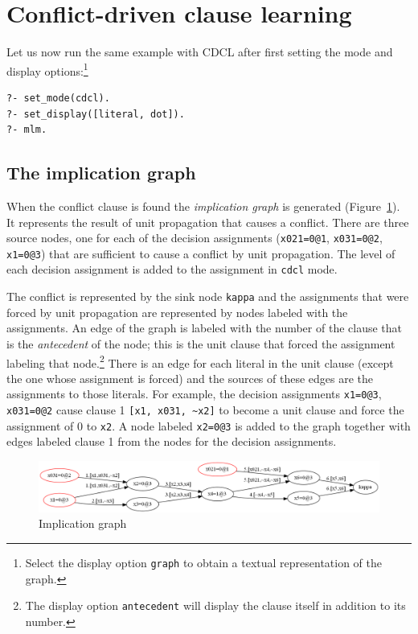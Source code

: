 \documentclass[11pt]{report}
\newcommand*{\p}[1]{\textup{\texttt{#1}}}
\begin{document}
\section{Conflict-driven clause learning}

Let us now run the same example with CDCL after first setting the mode
and display options:\footnote{Select the display option \p{graph} to
obtain a textual representation of the graph.}

\begin{verbatim}
?- set_mode(cdcl).
?- set_display([literal, dot]).
?- mlm.
\end{verbatim}

\subsection{The implication graph}

When the conflict clause is found the \emph{implication graph} is
generated (Figure~\ref{fig.graph}). It represents the result of unit
propagation that causes a conflict. There are three source nodes, one
for each of the decision assignments (\p{x021=0@1}, \p{x031=0@2},
\p{x1=0@3}) that are sufficient to cause a conflict by unit propagation.
The level of each decision assignment is added to the assignment in
\p{cdcl} mode.

The conflict is represented by the sink node \p{kappa} and the
assignments that were forced by unit propagation are represented by
nodes labeled with the assignments. An edge of the graph is labeled with
the number of the clause that is the \emph{antecedent} of the node; this
is the unit clause that forced the assignment labeling that
node.\footnote{The display option \p{antecedent} will display the clause
itself in addition to its number.} There is an edge for each literal in
the unit clause (except the one whose assignment is forced) and the
sources of these edges are the assignments to those literals. For
example, the decision assignments \p{x1=0@3}, \p{x031=0@2}
cause clause 1 \verb+[x1, x031, ~x2]+ to become a unit clause
and force the assignment of 0 to \p{x2}. A node labeled \p{x2=0@3} is
added to the graph together with edges labeled clause 1 from the
nodes for the decision assignments.

\begin{figure}
\begin{center}
\includegraphics[keepaspectratio=true,width=\textwidth]{graph}
\end{center}
\caption{Implication graph}\label{fig.graph}
\end{figure}
\end{document}
